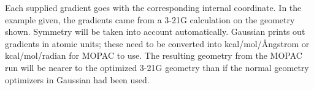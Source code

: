Each  supplied  gradient  goes  with  the  corresponding   internal
coordinate.   In  the  example  given,  the  gradients came from a 3-21G
calculation on the geometry shown.  Symmetry will be taken into  account
automatically. Gaussian  prints  out  gradients in atomic units; these need to
be converted into kcal/mol/\AA ngstrom or kcal/mol/radian for MOPAC to use. 
The resulting geometry from the MOPAC run will be nearer to the optimized 3-21G
geometry than  if  the  normal  geometry  optimizers  in Gaussian had been
used.
